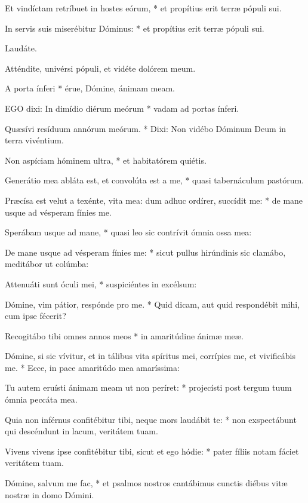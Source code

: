 Et vindíctam retríbuet in hostes eórum, * et propítius erit terræ pópuli sui.

 In servis suis miserébitur Dóminus: * et propítius erit terræ pópuli sui.

 Laudáte. \textdagger


 Atténdite, univérsi pópuli, et vidéte dolórem meum.

 A porta ínferi * érue, Dómine, ánimam meam.


\lettrine[lines=2]{E}{GO} dixi: In dimídio diérum meórum * vadam ad portas ínferi.

Quæsívi resíduum annórum meórum. * Dixi: Non vidébo Dóminum Deum in terra vivéntium.

Non aspíciam hóminem ultra, * et habitatórem quiétis.

Generátio mea abláta est, et convolúta est a me, * quasi tabernáculum pastórum.

Præcísa est velut a texénte, vita mea: dum adhuc ordírer, succídit me: * de mane usque ad vésperam fínies me.

Sperábam usque ad mane, * quasi leo sic contrívit ómnia ossa mea:

De mane usque ad vésperam fínies me: * sicut pullus hirúndinis sic clamábo, meditábor ut colúmba:

Attenuáti sunt óculi mei, * suspiciéntes in excélsum:

Dómine, vim pátior, respónde pro me. * Quid dicam, aut quid respondébit mihi, cum ipse fécerit?

Recogitábo tibi omnes annos meos * in amaritúdine ánimæ meæ.

Dómine, si sic vívitur, et in tálibus vita spíritus mei, corrípies me, et vivificábis me. * Ecce, in pace amaritúdo mea amaríssima:

Tu autem eruísti ánimam meam ut non períret: * projecísti post tergum tuum ómnia peccáta mea.

Quia non inférnus confitébitur tibi, neque mors laudábit te: * non exspectábunt qui descéndunt in lacum, veritátem tuam.

Vivens vivens ipse confitébitur tibi, sicut et ego hódie: * pater fíliis notam fáciet veritátem tuam.

Dómine, salvum me fac, * et psalmos nostros cantábimus cunctis diébus vitæ nostræ in domo Dómini.


